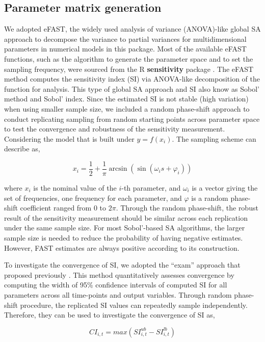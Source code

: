 \documentclass[preprint,12pt, a4paper]{elsarticle}
\begin{document}
\subsection{Parameter matrix generation}

We adopted eFAST, the widely used analysis of variance (ANOVA)-like
global SA approach to decompose the variance to partial variances for
multidimensional parameters in numerical models in this package. Most of
the available eFAST functions, such as the algorithm to generate the
parameter space and to set the sampling frequency, were sourced from the
R \textbf{sensitivity} package \cite{R-sensitivity}. The eFAST method
computes the sensitivity index (SI) via ANOVA-like decomposition of the
function for analysis. This type of global SA approach and SI also know
as Sobol' method and Sobol' index. Since the estimated SI is not stable
(high variation) when using smaller sample size, we included a random
phase-shift approach to conduct replicating sampling from random
starting points across parameter space to test the convergence and
robustness of the sensitivity measurement. Considering the model that is
built under \(y=f(x_{i})\). The sampling scheme can describe as,

\[ x_i = \frac{1}{2} + \frac{1}{\pi}\arcsin(\sin(\omega_is + \varphi_i)) \]


where \(x_i\) is the nominal value of the \(i\)-th parameter, and
\(\omega_i\) is a vector giving the set of frequencies, one frequency
for each parameter, and \(\varphi\) is a random phase-shift coefficient
ranged from 0 to \(2\pi\). Through the random
phase-shift, the robust result of the sensitivity measurement should be
similar across each replication under the same sample size. For most
Sobol'-based SA algorithms, the larger sample size is needed to reduce
the probability of having negative estimates. However, FAST estimates
are always positive according to its construction.

To investigate the convergence of SI, we adopted the ``exam'' approach that
proposed previously \cite{sarrazin2016global}. This method quantitatively
assesses convergence by computing the width of 95\% confidence intervals
of computed SI for all parameters across all time-points and output
variables. Through random phase-shift procedure, the replicated SI
values can repeatedly sample independently. Therefore, they can be used
to investigate the convergence of SI as,

\[CI_{i,t} = max(SI_{i,t}^{ub}-SI_{i,t}^{lb})\]
\end{document}
